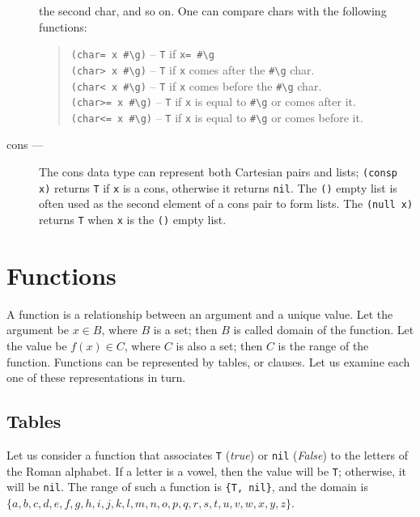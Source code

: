 \documentclass[a4paper,12pt]{book}
\begin{document}
\begin{description}
the second char, and so on. One can compare
chars with the following functions:
\begin{quote}
\verb|(char= x #\g)| -- \verb|T| if \verb|x= #\g|\\
\verb|(char> x #\g)| -- \verb|T| if \verb|x| comes
after the \verb|#\g| char.\\
\verb|(char< x #\g)| -- \verb|T| if \verb|x| comes
before the \verb|#\g| char.\\
\verb|(char>= x #\g)| -- \verb|T| if \verb|x| is
equal to \verb|#\g| or comes after it.\\
\verb|(char<= x #\g)| -- \verb|T| if \verb|x| is
equal to \verb|#\g| or comes before it.\\
\end{quote}
\item[cons ---] The cons data type can represent both
Cartesian pairs and lists; \verb|(consp x)| returns
\verb|T| if \verb|x| is a cons,
otherwise it returns \verb|nil|. The \verb|()| empty
list is often used as the second element of a cons pair
to form lists. The \verb|(null x)| returns \verb|T| when
\verb|x| is the \verb|()| empty list.
\end{description}


\section{Functions}
A function is a relationship between an argument and a unique value.
Let the argument be $x\in B$, where $B$ is a set; then $B$ is called
domain of the function. Let the value be $f(x)\in C$, where $C$ is
also a set; then $C$ is the range of the function.
Functions can be represented by tables, or clauses. Let us examine
each one of these representations in turn.

\subsection*{Tables}
Let us consider a function that associates \verb|T| ({\em true})
or \verb|nil| ({\em False}) to the letters of the Roman alphabet.
If a letter is a vowel, then the value will be \verb|T|; otherwise, 
it will be \verb|nil|. The range of such a function is \verb|{T, nil}|, and the domain is
$\{a,b,c,d,e,f,g,h,i,j,k,l,m,n,o,p,q,r,s,t,u,v,w,x,y,z\}$.\\
\end{document}
